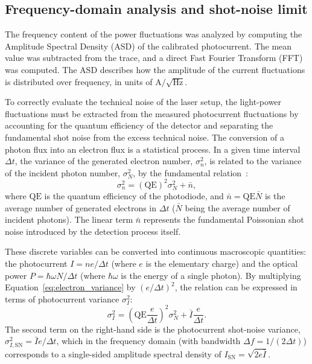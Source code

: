\subsection{Frequency-domain analysis and shot-noise limit}

The frequency content of the power fluctuations was analyzed by computing the Amplitude Spectral Density (ASD) of the calibrated photocurrent. The mean value was subtracted from the trace, and a direct Fast Fourier Transform (FFT) was computed. The ASD describes how the amplitude of the current fluctuations is distributed over frequency, in units of $\mathrm{A/\sqrt{Hz}}$.

To correctly evaluate the technical noise of the laser setup, the light-power fluctuations must be extracted from the measured photocurrent fluctuations by accounting for the quantum efficiency of the detector and separating the fundamental shot noise from the excess technical noise. The conversion of a photon flux into an electron flux is a statistical process. In a given time interval $\Delta t$, the variance of the generated electron number, $\sigma_n^2$, is related to the variance of the incident photon number, $\sigma_N^2$, by the fundamental relation~\cite{Saleh2019}:
\begin{equation}
    \sigma_n^2 
    = 
    (\mathrm{QE})^2 \sigma_N^2 + \bar{n},
    \label{eq:electron_variance}
\end{equation}
where $\mathrm{QE}$ is the quantum efficiency of the photodiode, and $\bar{n} = \mathrm{QE} \bar{N}$ is the average number of generated electrons in $\Delta t$ ($\bar{N}$ being the average number of incident photons). The linear term $\bar{n}$ represents the fundamental Poissonian shot noise introduced by the detection process itself.

These discrete variables can be converted into continuous macroscopic quantities: the photocurrent $I = n e / \Delta t$ (where $e$ is the elementary charge) and the optical power $P = \hbar\omega N / \Delta t$ (where $\hbar\omega$ is the energy of a single photon). By multiplying Equation~\ref{eq:electron_variance} by $(e/\Delta t)^2$, the relation can be expressed in terms of photocurrent variance $\sigma_I^2$:
\begin{equation}
    \sigma_I^2 
    = 
    \left( \mathrm{QE} \frac{e}{\Delta t} \right)^2 \sigma_N^2 + \bar{I} \frac{e}{\Delta t}.
\end{equation}
The second term on the right-hand side is the photocurrent shot-noise variance, $\sigma_{I, \mathrm{SN}}^2 = \bar{I} e / \Delta t$, which in the frequency domain (with bandwidth $\Delta f = 1/(2\Delta t)$) corresponds to a single-sided amplitude spectral density of $I_{\mathrm{SN}} = \sqrt{2e\bar{I}}$. 


